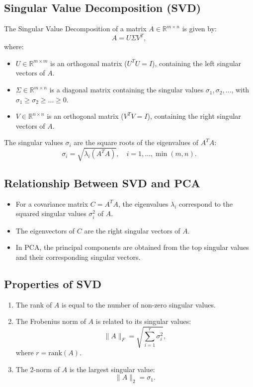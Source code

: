 \documentclass[12pt,a4paper]{article}
\begin{document}
\subsection{Singular Value Decomposition (SVD)}
The Singular Value Decomposition of a matrix $A \in \mathbb{R}^{m \times n}$ is given by:
\begin{equation}
A = U \Sigma V^T,
\end{equation}
where:
\begin{itemize}
    \item $U \in \mathbb{R}^{m \times m}$ is an orthogonal matrix ($U^T U = I$), containing the left singular vectors of $A$.
    \item $\Sigma \in \mathbb{R}^{m \times n}$ is a diagonal matrix containing the singular values $\sigma_1, \sigma_2, \ldots$, with $\sigma_1 \geq \sigma_2 \geq \ldots \geq 0$.
    \item $V \in \mathbb{R}^{n \times n}$ is an orthogonal matrix ($V^T V = I$), containing the right singular vectors of $A$.
\end{itemize}

The singular values $\sigma_i$ are the square roots of the eigenvalues of $A^T A$:
\begin{equation}
\sigma_i = \sqrt{\lambda_i(A^T A)}, \quad i = 1, \ldots, \min(m, n).
\end{equation}

\subsection{Relationship Between SVD and PCA}
\begin{itemize}
    \item For a covariance matrix $C = A^T A$, the eigenvalues $\lambda_i$ correspond to the squared singular values $\sigma_i^2$ of $A$.
    \item The eigenvectors of $C$ are the right singular vectors of $A$.
    \item In PCA, the principal components are obtained from the top singular values and their corresponding singular vectors.
\end{itemize}

\subsection{Properties of SVD}
\begin{enumerate}
    \item The rank of $A$ is equal to the number of non-zero singular values.
    \item The Frobenius norm of $A$ is related to its singular values:
    \begin{equation}
    \|A\|_F = \sqrt{\sum_{i=1}^r \sigma_i^2},
    \end{equation}
    where $r = \text{rank}(A)$.
    \item The 2-norm of $A$ is the largest singular value:
    \begin{equation}
    \|A\|_2 = \sigma_1.
    \end{equation}
\end{enumerate}
\end{document}
